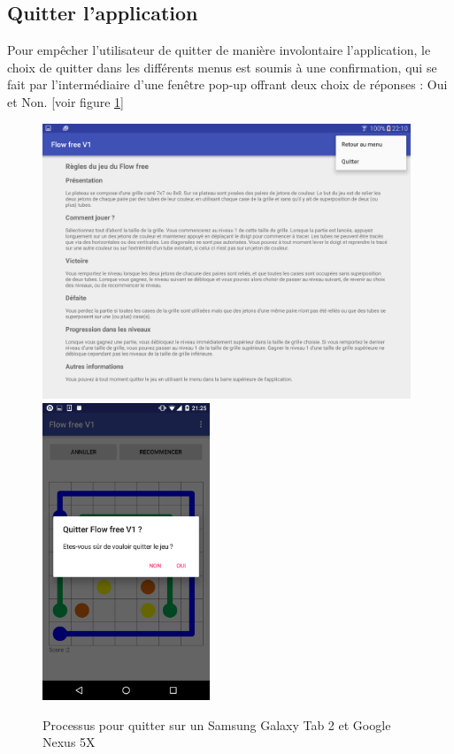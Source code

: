 \documentclass[12pt, a4paper]{article}%
\begin{document}
	\subsection{Quitter l'application}
	Pour empêcher l'utilisateur de quitter de manière involontaire l'application, le choix de quitter dans les différents menus est soumis à une confirmation, qui se fait par l'intermédiaire d'une fenêtre pop-up offrant deux choix de réponses : Oui et Non. [voir figure \ref{fig:quitter}]
	
\begin{figure}
\includegraphics[width=11cm]{Images/s2_2.png}\hfill
\includegraphics[width=5cm]{Images/nexus_7.png}
\caption{Processus pour quitter sur un Samsung Galaxy Tab 2 et Google Nexus 5X}\label{fig:quitter}
\end{figure}
	
\end{document}
